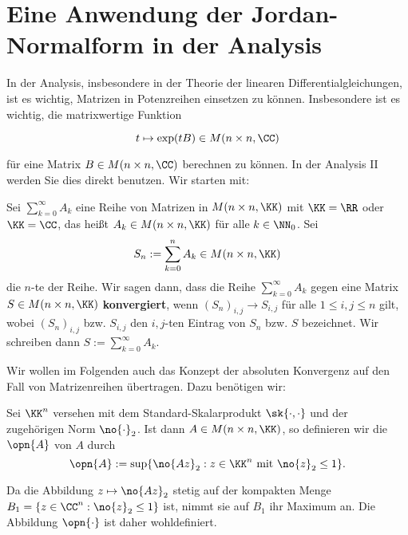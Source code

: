 \section{Eine Anwendung der Jordan-Normalform in der Analysis}
\label{sec:2.10}

In der Analysis, insbesondere in der Theorie der linearen Differentialgleichungen, ist es wichtig, Matrizen in Potenzreihen einsetzen zu können.
Insbesondere ist es wichtig, die matrixwertige Funktion

\[
	t \mapsto \exp(tB) \in M(n \times n, \CC)
\]

für eine Matrix $B \in M(n \times n, \CC)$ berechnen zu können.
In der Analysis II werden Sie dies direkt benutzen.
Wir starten mit:

\begin{definition}
	\label{def:10.1}
	Sei $\sum_{k=0}^{\infty} A_k$ eine Reihe von Matrizen in $M(n \times n, \KK)$ mit $\KK = \RR$ oder $\KK= \CC$, das heißt $A_k \in M(n \times n,\KK)$ für alle $k \in \NN_0$.
	Sei
	\[
		S_n := \sum_{k=0}^{n} A_k \in M(n \times n, \KK)
	\]
	die $n$-te  der Reihe.
	Wir sagen dann, dass die Reihe $\sum_{k=0}^{\infty} A_k$ gegen eine Matrix $S \in M(n \times n, \KK)$ \textbf{konvergiert}, wenn $(S_n)_{i,j} \rightarrow S_{i,j}$ für alle $1 \leq i,j \leq n$ gilt, wobei $(S_n)_{i,j}$ bzw. $S_{i,j}$ den $i,j$-ten Eintrag von $S_n$ bzw. $S$ bezeichnet.
	Wir schreiben dann $S := \sum_{k=0}^{\infty} A_k$.  
\end{definition}

Wir wollen im Folgenden auch das Konzept der absoluten Konvergenz auf den Fall von Matrizenreihen übertragen.
Dazu benötigen wir:

\begin{definition}[Operatornorm]
	\label{def:10.2}
	Sei $\KK^n$ versehen mit dem Standard-Skalarprodukt $\sk{\cdot,\cdot}$ und der zugehörigen Norm $\no{\cdot}_2$.
	Ist dann $A \in M(n \times n, \KK)$, so definieren wir die  $\opn{A}$ von $A$ durch
	\[
		\opn{A} := \sup \{ \no{Az}_2 : z \in \KK^n \text{ mit } \no{z}_2 \leq 1\}.
	\]
\end{definition}

Da die Abbildung $z \mapsto \no{Az}_2$ stetig auf der kompakten Menge $B_1 = \{z \in \CC^n : \no{z}_2 \leq 1\}$ ist, nimmt sie auf $B_1$ ihr Maximum an.
Die Abbildung $\opn{\cdot}$ ist daher wohldefiniert.

